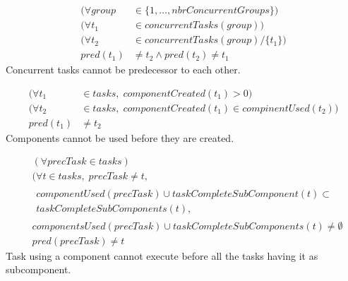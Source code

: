  \begin{equation}
 \begin{aligned}\label{eq:88}
 (\forall group &\in \{1 , \ldots , nbrConcurrentGroups\}) \\
 (\forall t_1 &\in concurrentTasks(group)) \\
 (\forall t_2 &\in concurrentTasks(group) / \{t_1\}) \\
 pred(t_1) &\neq t_2 \land pred(t_2) \neq t_1
 \end{aligned}
 \end{equation}
 Concurrent tasks cannot be predecessor to each other.
 
 \begin{equation}
 \begin{aligned}\label{eq:89}
 (\forall t_1 &\in tasks, \; componentCreated(t_1) > 0) \\
 (\forall t_2 &\in tasks, \; componentCreated(t_1) \in compinentUsed(t_2)) \\
 pred(t_1) &\neq t_2
 \end{aligned}
 \end{equation}
 Components cannot be used before they are created.
 
 \begin{equation}
 \begin{aligned}\label{eq:90}
 &(\forall precTask \in tasks) \\
 &(\forall t \in tasks, \; precTask \neq t,\\
 &\begin{aligned}componentUsed(precTask) \cup taskCompleteSubComponent(t) \subset\\
 taskCompleteSubComponents(t), \end{aligned}\\
 &componentsUsed(precTask) \cup taskCompleteSubComponents(t) \neq \emptyset \\
 &pred(precTask) \neq t
 \end{aligned}
 \end{equation}
 Task using a component cannot execute before all the tasks having it as subcomponent.
 
